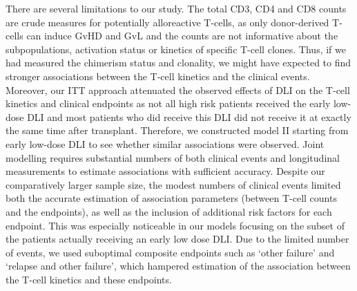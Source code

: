 \documentclass[
  letterpaper,
  DIV=11,
  numbers=noendperiod]{scrreprt}
\begin{document}
There are several limitations to our study. The total CD3, CD4 and CD8
counts are crude measures for potentially alloreactive T-cells, as only
donor-derived T-cells can induce GvHD and GvL and the counts are not
informative about the subpopulations, activation status or kinetics of
specific T-cell clones. Thus, if we had measured the chimerism status
and clonality, we might have expected to find stronger associations
between the T-cell kinetics and the clinical events. Moreover, our ITT
approach attenuated the observed effects of DLI on the T-cell kinetics
and clinical endpoints as not all high risk patients received the early
low-dose DLI and most patients who did receive this DLI did not receive
it at exactly the same time after transplant. Therefore, we constructed
model II starting from early low-dose DLI to see whether similar
associations were observed. Joint modelling requires substantial numbers
of both clinical events and longitudinal measurements to estimate
associations with sufficient accuracy. Despite our comparatively larger
sample size, the modest numbers of clinical events limited both the
accurate estimation of association parameters (between T-cell counts and
the endpoints), as well as the inclusion of additional risk factors for
each endpoint. This was especially noticeable in our models focusing on
the subset of the patients actually receiving an early low dose DLI. Due
to the limited number of events, we used suboptimal composite endpoints
such as `other failure' and `relapse and other failure', which hampered
estimation of the association between the T-cell kinetics and these
endpoints.
\end{document}
